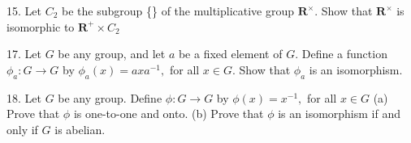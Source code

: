 \begin{mdframed}[style=darkAnswer,frametitle={Joe Starr}]
\end{mdframed}
\newpage
\begin{mdframed}[style=darkQuesion]
  15. Let $C_{2}$ be the subgroup \{\} of the multiplicative group $\mathbf{R}^{\times} .$ Show that $\mathbf{R}^{\times}$ is isomorphic to $\mathbf{R}^{+} \times C_{2}$
\end{mdframed}
\begin{mdframed}[style=darkAnswer,frametitle={Joe Starr}]
\end{mdframed}
\newpage
\begin{mdframed}[style=darkQuesion]
  17. Let $G$ be any group, and let $a$ be a fixed element of $G .$ Define a function $\phi_{a}: G \rightarrow G$
  by $\phi_{a}(x)=a x a^{-1},$ for all $x \in G .$ Show that $\phi_{a}$ is an isomorphism.
\end{mdframed}
\begin{mdframed}[style=darkAnswer,frametitle={Joe Starr}]
\end{mdframed}
\newpage
\begin{mdframed}[style=darkQuesion]
  18. Let $G$ be any group. Define $\phi: G \rightarrow G$ by $\phi(x)=x^{-1},$ for all $x \in G$
  (a) Prove that $\phi$ is one-to-one and onto.
  (b) Prove that $\phi$ is an isomorphism if and only if $G$ is abelian.
\end{mdframed}
